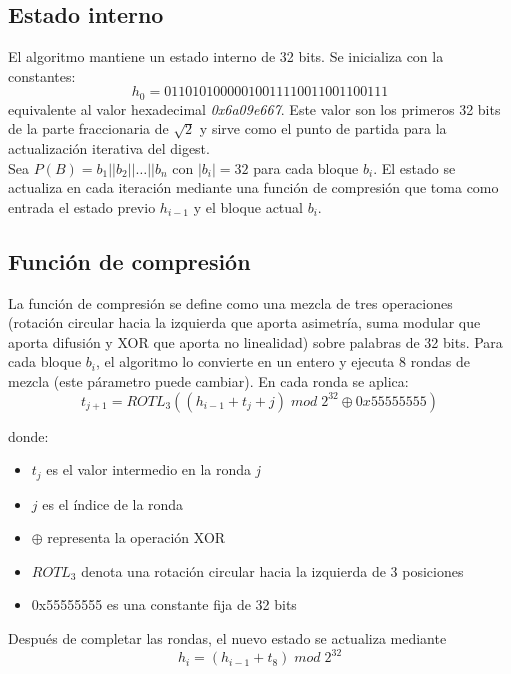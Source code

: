 \documentclass[11pt, letterpaper]{article}
\begin{document}
\subsection{Estado interno}
El algoritmo mantiene un estado interno de 32 bits. Se inicializa con la constantes:
\begin{equation}
    h_0 = 01101010000010011110011001100111
\end{equation}
equivalente al valor hexadecimal \textit{0x6a09e667}. Este valor son los primeros 32 bits de la parte fraccionaria de $\sqrt{2}$ y sirve como el punto de partida para la actualización iterativa del digest.\\

Sea $P(B) = b_1 || b_2 || \dots || b_n$ con $|b_i| = 32$ para cada bloque $b_i$. El estado se actualiza en cada iteración mediante una función de compresión que toma como entrada el estado previo $h_{i-1}$ y el bloque actual $b_i$.
\subsection{Función de compresión}
La función de compresión se define como una mezcla de tres operaciones (rotación circular hacia la izquierda que aporta asimetría, suma modular que aporta difusión y XOR que aporta no linealidad) sobre palabras de 32 bits. Para cada bloque $b_i$, el algoritmo lo convierte en un entero y ejecuta 8 rondas de mezcla (este párametro puede cambiar). En cada ronda se aplica:
\begin{equation}
    t_{j+1} = ROTL_3((h_{i-1} + t_j + j)\; mod\; 2^{32} \oplus 0x55555555)
\end{equation} \newpage

donde:
\begin{itemize}
    \item $t_j$ es el valor intermedio en la ronda \textit{j}
    \item $j$ es el índice de la ronda
    \item $\oplus$ representa la operación XOR
    \item $ROTL_3$ denota una rotación circular hacia la izquierda de 3 posiciones
    \item 0x55555555 es una constante fija de 32 bits
\end{itemize}

Después de completar las rondas, el nuevo estado se actualiza mediante 
\begin{equation}
    h_i = (h_{i-1}+t_8) \; mod \; 2^{32}
\end{equation}
\end{document}
